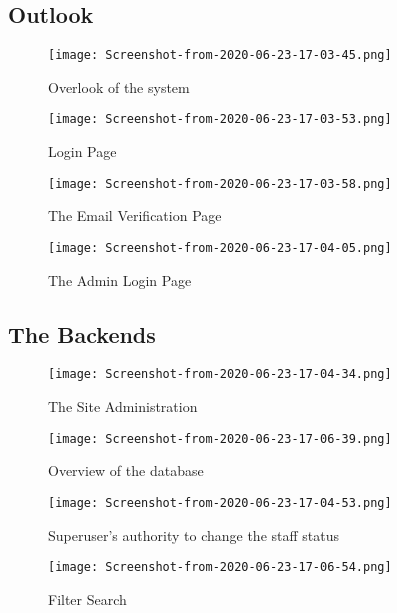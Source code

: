 \documentclass[12pt]{report}
\begin{document}
\subsection{Outlook}
\begin{figure}[!htb]
  \centering
  \begin{minipage}[b]{0.4\textwidth}
    \texttt{[image: Screenshot-from-2020-06-23-17-03-45.png]}
    \caption{Overlook of the system}
  \end{minipage}
  \hfill
  \begin{minipage}[b]{0.4\textwidth}
    \texttt{[image: Screenshot-from-2020-06-23-17-03-53.png]}
    \caption{Login Page}
  \end{minipage}
\end{figure}

\begin{figure}[!htb]
  \centering
  \begin{minipage}[b]{0.4\textwidth}
    \texttt{[image: Screenshot-from-2020-06-23-17-03-58.png]}
    \caption{The Email Verification Page}
  \end{minipage}
  \hfill
  \begin{minipage}[b]{0.4\textwidth}
    \texttt{[image: Screenshot-from-2020-06-23-17-04-05.png]}
    \caption{The Admin Login Page}
  \end{minipage}
\end{figure}
\subsection{The Backends}
\begin{figure}[!htb]
  \centering
  \begin{minipage}[b]{0.4\textwidth}
    \texttt{[image: Screenshot-from-2020-06-23-17-04-34.png]}
    \caption{The Site Administration}
  \end{minipage}
  \hfill
  \begin{minipage}[b]{0.4\textwidth}
    \texttt{[image: Screenshot-from-2020-06-23-17-06-39.png]}
    \caption{Overview of the database}
  \end{minipage}
\end{figure}
\newpage

\begin{figure}[!htb]
  \centering
  \begin{minipage}[b]{0.4\textwidth}
    \texttt{[image: Screenshot-from-2020-06-23-17-04-53.png]}
    \caption{Superuser's authority to change the staff status}
  \end{minipage}
  \hfill
  \begin{minipage}[b]{0.4\textwidth}
    \texttt{[image: Screenshot-from-2020-06-23-17-06-54.png]}
    \caption{Filter Search}
  \end{minipage}
\end{figure}
\end{document}
